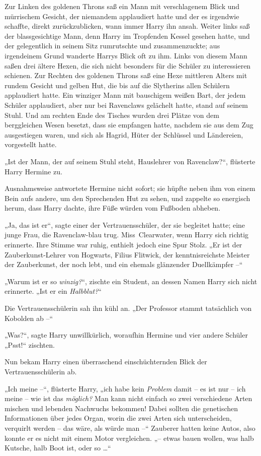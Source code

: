 Zur Linken des goldenen Throns saß ein Mann mit verschlagenem Blick und mürrischem Gesicht, der niemandem applaudiert hatte und der es irgendwie schaffte, direkt zurückzublicken, wann immer Harry ihn ansah. Weiter links saß der blassgesichtige Mann, denn Harry im Tropfenden Kessel gesehen hatte, und der gelegentlich in seinem Sitz rumrutschte und zusammenzuckte; aus irgendeinem Grund wanderte Harrys Blick oft zu ihm. Links von diesem Mann saßen drei ältere Hexen, die sich nicht besonders für die Schüler zu interessieren schienen. Zur Rechten des goldenen Throns saß eine Hexe mittleren Alters mit rundem Gesicht und gelben Hut, die bis auf die Slytherins allen Schülern applaudiert hatte. Ein winziger Mann mit bauschigem weißen Bart, der jedem Schüler applaudiert, aber nur bei Ravenclaws gelächelt hatte, stand auf seinem Stuhl. Und am rechten Ende des Tisches wurden drei Plätze von dem berggleichen Wesen besetzt, dass sie empfangen hatte, nachdem sie aus dem Zug ausgestiegen waren, und sich als Hagrid, Hüter der Schlüssel und Ländereien, vorgestellt hatte.

„Ist der Mann, der auf seinem Stuhl steht, Hauslehrer von Ravenclaw?“, flüsterte Harry Hermine zu.

Ausnahmsweise antwortete Hermine nicht sofort; sie hüpfte neben ihm von einem Bein aufs andere, um den Sprechenden Hut zu sehen, und zappelte so energisch herum, dass Harry dachte, ihre Füße würden vom Fußboden abheben.

„Ja, das ist er“, sagte einer der Vertrauensschüler, der sie begleitet hatte; eine junge Frau, die Ravenclaw-blau trug. Miss~Clearwater, wenn Harry sich richtig erinnerte. Ihre Stimme war ruhig, enthielt jedoch eine Spur Stolz. „Er ist der Zauberkunst-Lehrer von Hogwarts, Filius Flitwick, der kenntnisreichste Meister der Zauberkunst, der noch lebt, und ein ehemals glänzender Duellkämpfer –“

„Warum ist er so \emph{winzig?}“, zischte ein Student, an dessen Namen Harry sich nicht erinnerte. „Ist er ein \emph{Halbblut?}“

Die Vertrauensschülerin sah ihn kühl an. „Der Professor stammt tatsächlich von Kobolden ab –“

„Was?“, sagte Harry unwillkürlich, woraufhin Hermine und vier andere Schüler „Psst!“ zischten.

Nun bekam Harry einen überraschend einschüchternden Blick der Vertrauensschülerin ab.

„Ich meine –“, flüsterte Harry, „ich habe kein \emph{Problem} damit – es ist nur – ich meine – wie ist das \emph{möglich?} Man kann nicht einfach so zwei verschiedene Arten mischen und lebenden Nachwuchs bekommen! Dabei sollten die genetischen Informationen über jedes Organ, worin die zwei Arten sich unterscheiden, verquirlt werden – das wäre, als würde man –“ Zauberer hatten keine Autos, also konnte er es nicht mit einem Motor vergleichen. „– etwas bauen wollen, was halb Kutsche, halb Boot ist, oder so …“

